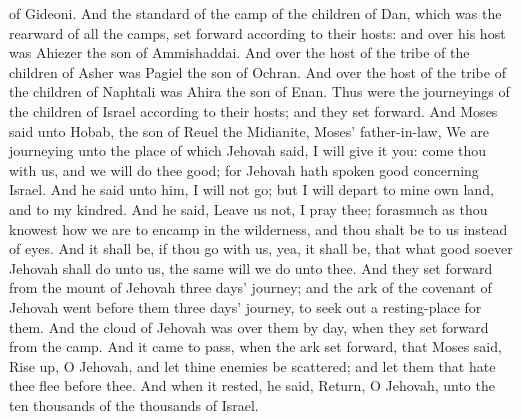 of Gideoni.  And the standard of the camp of the children of Dan, which was the rearward of all the camps, set forward according to their hosts: and over his host was Ahiezer the son of Ammishaddai. And over the host of the tribe of the children of Asher was Pagiel the son of Ochran. And over the host of the tribe of the children of Naphtali was Ahira the son of Enan. Thus were the journeyings of the children of Israel according to their hosts; and they set forward.  And Moses said unto Hobab, the son of Reuel the Midianite, Moses’ father-in-law, We are journeying unto the place of which Jehovah said, I will give it you: come thou with us, and we will do thee good; for Jehovah hath spoken good concerning Israel. And he said unto him, I will not go; but I will depart to mine own land, and to my kindred. And he said, Leave us not, I pray thee; forasmuch as thou knowest how we are to encamp in the wilderness, and thou shalt be to us instead of eyes. And it shall be, if thou go with us, yea, it shall be, that what good soever Jehovah shall do unto us, the same will we do unto thee.  And they set forward from the mount of Jehovah three days’ journey; and the ark of the covenant of Jehovah went before them three days’ journey, to seek out a resting-place for them. And the cloud of Jehovah was over them by day, when they set forward from the camp.  And it came to pass, when the ark set forward, that Moses said, Rise up, O Jehovah, and let thine enemies be scattered; and let them that hate thee flee before thee. And when it rested, he said, Return, O Jehovah, unto the ten thousands of the thousands of Israel. 

